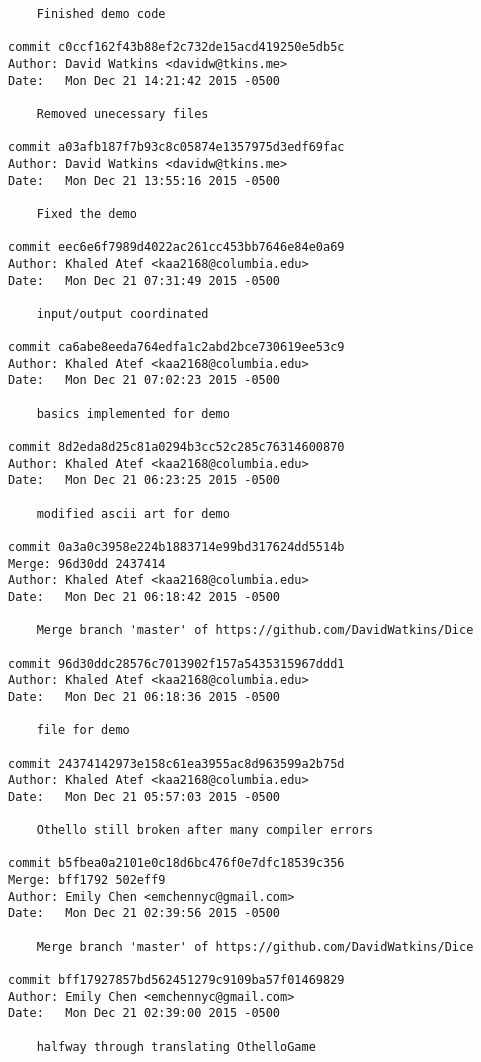 \begin{verbatim}
    Finished demo code

commit c0ccf162f43b88ef2c732de15acd419250e5db5c
Author: David Watkins <davidw@tkins.me>
Date:   Mon Dec 21 14:21:42 2015 -0500

    Removed unecessary files

commit a03afb187f7b93c8c05874e1357975d3edf69fac
Author: David Watkins <davidw@tkins.me>
Date:   Mon Dec 21 13:55:16 2015 -0500

    Fixed the demo

commit eec6e6f7989d4022ac261cc453bb7646e84e0a69
Author: Khaled Atef <kaa2168@columbia.edu>
Date:   Mon Dec 21 07:31:49 2015 -0500

    input/output coordinated

commit ca6abe8eeda764edfa1c2abd2bce730619ee53c9
Author: Khaled Atef <kaa2168@columbia.edu>
Date:   Mon Dec 21 07:02:23 2015 -0500

    basics implemented for demo

commit 8d2eda8d25c81a0294b3cc52c285c76314600870
Author: Khaled Atef <kaa2168@columbia.edu>
Date:   Mon Dec 21 06:23:25 2015 -0500

    modified ascii art for demo

commit 0a3a0c3958e224b1883714e99bd317624dd5514b
Merge: 96d30dd 2437414
Author: Khaled Atef <kaa2168@columbia.edu>
Date:   Mon Dec 21 06:18:42 2015 -0500

    Merge branch 'master' of https://github.com/DavidWatkins/Dice

commit 96d30ddc28576c7013902f157a5435315967ddd1
Author: Khaled Atef <kaa2168@columbia.edu>
Date:   Mon Dec 21 06:18:36 2015 -0500

    file for demo

commit 24374142973e158c61ea3955ac8d963599a2b75d
Author: Khaled Atef <kaa2168@columbia.edu>
Date:   Mon Dec 21 05:57:03 2015 -0500

    Othello still broken after many compiler errors

commit b5fbea0a2101e0c18d6bc476f0e7dfc18539c356
Merge: bff1792 502eff9
Author: Emily Chen <emchennyc@gmail.com>
Date:   Mon Dec 21 02:39:56 2015 -0500

    Merge branch 'master' of https://github.com/DavidWatkins/Dice

commit bff17927857bd562451279c9109ba57f01469829
Author: Emily Chen <emchennyc@gmail.com>
Date:   Mon Dec 21 02:39:00 2015 -0500

    halfway through translating OthelloGame


\end{verbatim}
